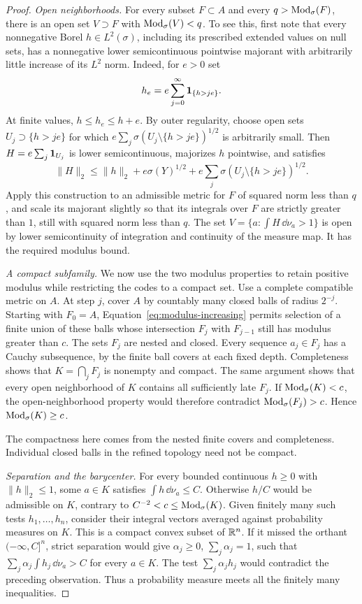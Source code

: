 \begin{proof}
\smallskip\noindent
\emph{Open neighborhoods.}
For every subset \(F\subset A\) and every \(q>\operatorname{Mod}_\sigma(F)\), there is
an open set \(V\supset F\) with \(\operatorname{Mod}_\sigma(V)<q\).
To see this, first note that every nonnegative Borel
\(h\in L^2(\sigma)\), including its prescribed extended values on null
sets, has a nonnegative lower semicontinuous pointwise majorant with
arbitrarily little increase of its \(L^2\) norm.  Indeed, for \(e>0\) set
\[
 h_e=e\sum_{j=0}^{\infty}\mathbf 1_{\{h>je\}}.
\]
At finite values, \(h\le h_e\le h+e\).  By outer regularity, choose open
sets \(U_j\supset\{h>je\}\) for which
\(e\sum_j\sigma(U_j\setminus\{h>je\})^{1/2}\) is arbitrarily small.
Then
\(H=e\sum_j\mathbf 1_{U_j}\) is lower semicontinuous, majorizes \(h\)
pointwise, and satisfies
\[
 \|H\|_2\le\|h\|_2+e\sigma(Y)^{1/2}
       +e\sum_j\sigma(U_j\setminus\{h>je\})^{1/2}.
\]
Apply this construction to an admissible metric for \(F\) of squared norm
less than \(q\), and scale its majorant slightly so that its integrals over
\(F\) are strictly greater than \(1\), still with squared norm less than
\(q\).  The set
\(V=\{a:\int H\,\dd\nu_a>1\}\) is open by lower semicontinuity of
integration and continuity of the measure map.  It has the required modulus
bound.

\smallskip\noindent
\emph{A compact subfamily.}
We now use the two modulus properties to retain positive modulus while
restricting the codes to a compact set.  Use a complete compatible metric
on \(A\).  At step \(j\), cover \(A\)
by countably many closed balls of radius \(2^{-j}\).  Starting with
\(F_0=A\), Equation~\eqref{eq:modulus-increasing} permits selection of a
finite union of these balls whose intersection \(F_j\) with \(F_{j-1}\)
still has modulus greater than \(c\).  The sets \(F_j\) are nested and
closed.  Every sequence \(a_j\in F_j\) has a Cauchy subsequence, by the
finite ball covers at each fixed depth.  Completeness shows that
\(K=\bigcap_jF_j\) is nonempty and compact.  The same argument shows that
every open neighborhood of \(K\) contains all sufficiently late \(F_j\).
If \(\operatorname{Mod}_\sigma(K)<c\), the open-neighborhood property would therefore
contradict \(\operatorname{Mod}_\sigma(F_j)>c\).  Hence
\(\operatorname{Mod}_\sigma(K)\ge c\).

The compactness here comes from the nested finite covers and completeness.
Individual closed balls in the refined topology need not be compact.

\smallskip\noindent
\emph{Separation and the barycenter.}
For every bounded continuous \(h\ge0\) with \(\|h\|_2\le1\), some
\(a\in K\) satisfies \(\int h\,\dd\nu_a\le C\).  Otherwise \(h/C\)
would be admissible on \(K\), contrary to
\(C^{-2}<c\le\operatorname{Mod}_\sigma(K)\).
Given finitely many such tests \(h_1,\ldots,h_n\), consider their integral
vectors averaged against probability measures on \(K\).  This is a compact
convex subset of \(\mathbb R^n\).  If it missed the orthant
\(( -\infty,C]^n\), strict separation would give
\(\alpha_j\ge0\), \(\sum_j\alpha_j=1\), such that
\(\sum_j\alpha_j\int h_j\,\dd\nu_a>C\) for every \(a\in K\).
The test \(\sum_j\alpha_jh_j\) would contradict the preceding observation.
Thus a probability measure meets all the finitely many inequalities.


\end{proof}
